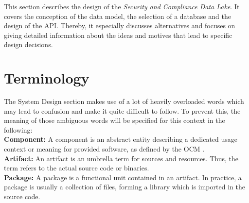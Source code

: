 
This section describes the design of the \textit{Security and Compliance Data Lake}. It covers the conception of the data model, the selection of a database and the design of the API. Thereby, it especially discusses alternatives and focuses on giving detailed information about the ideas and motives that lead to specific design decisions.

\section{Terminology}
The System Design section makes use of a lot of heavily overloaded words which may lead to confusion and make it quite difficult to follow. To prevent this, the meaning of those ambiguous words will be specified for this context in the following:\\

\noindent
\textbf{Component:} A component is an abstract entity describing a dedicated usage context or meaning for provided software, as defined by the OCM \cite{OCMSpec}.\\
\textbf{Artifact:} An artifact is an umbrella term for sources and resources. Thus, the term refers to the actual source code or binaries.\\
\textbf{Package:} A package is a functional unit contained in an artifact. In practice, a package is usually a collection of files, forming a library which is imported in the source code. 

